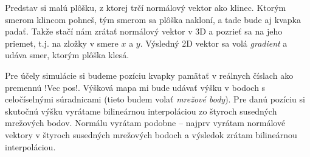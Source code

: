 \label{page:gradient}
Predstav si malú plôšku, z ktorej trčí normálový vektor ako klinec. Ktorým smerom klincom
pohneš, tým smerom sa plôška nakloní, a tade bude aj kvapka padať. Takže stačí nám
zrátať normálový vektor v 3D a pozrieť sa na jeho priemet, t.j. na zložky v smere $x$
a $y$. Výsledný 2D vektor sa volá {\em gradient} a udáva smer, ktorým plôška klesá. 


Pre účely simulácie si budeme pozíciu kvapky pamätať v reálnych číslach ako
premennú \prg!Vec pos!. Výšková mapa mi bude udávať výšku v bodoch s celočíselnými
súradnicami (tieto budem volať {\em mrežové body}).
Pre danú pozíciu si skutočnú výšku vyrátame bilineárnou interpoláciou zo 
štyroch susedných mrežových bodov. Normálu vyrátam podobne -- najprv vyrátam normálové 
vektory v štyroch susedných mrežových bodoch a výsledok zrátam bilineárnou interpoláciou.\\



